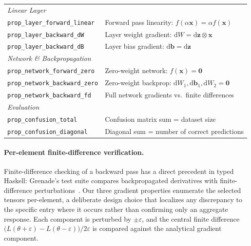 \documentclass[sigconf,nonacm]{acmart}
\begin{document}
\begin{table}[t]
\begin{tabular}{l l}
    \midrule
    \multicolumn{2}{l}{\emph{Linear Layer}} \\
    \texttt{prop\_layer\_forward\_linear} & Forward pass linearity: $f(\alpha \mathbf{x}) = \alpha f(\mathbf{x})$ \\
    \texttt{prop\_layer\_backward\_dW} & Layer weight gradient: $\mathrm{d}W = \mathrm{d}\mathbf{z} \otimes \mathbf{x}$ \\
    \texttt{prop\_layer\_backward\_dB} & Layer bias gradient: $\mathrm{d}\mathbf{b} = \mathrm{d}\mathbf{z}$ \\
    \midrule
    \multicolumn{2}{l}{\emph{Network \& Backpropagation}} \\
    \texttt{prop\_network\_forward\_zero} & Zero-weight network: $f(\mathbf{x}) = \mathbf{0}$ \\
    \texttt{prop\_network\_backward\_zero} & Zero-weight backprop: $\mathrm{d}W_1, \mathrm{d}\mathbf{b}_1, \mathrm{d}W_2 = \mathbf{0}$ \\
    \texttt{prop\_network\_backward\_fd} & Full network gradients vs.\ finite differences \\
    \midrule
    \multicolumn{2}{l}{\emph{Evaluation}} \\
    \texttt{prop\_confusion\_total} & Confusion matrix sum = dataset size \\
    \texttt{prop\_confusion\_diagonal} & Diagonal sum = number of correct predictions \\
    \bottomrule
  \end{tabular}
\end{table}

\paragraph{Per-element finite-difference verification.}
Finite-difference checking of a backward pass has a direct precedent in typed
Haskell: Grenade's test suite compares backpropagated derivatives with
finite-difference perturbations~\cite{campbell2016grenade}. Our three gradient
properties enumerate the selected tensors per-element, a deliberate design choice
that localizes any discrepancy to the specific entry where it occurs rather than
confirming only an aggregate response. Each component is perturbed by $\pm\varepsilon$,
and the central finite difference $\bigl(L(\theta+\varepsilon) - L(\theta-\varepsilon)\bigr)/2\varepsilon$
is compared against the analytical gradient component.
\end{document}
